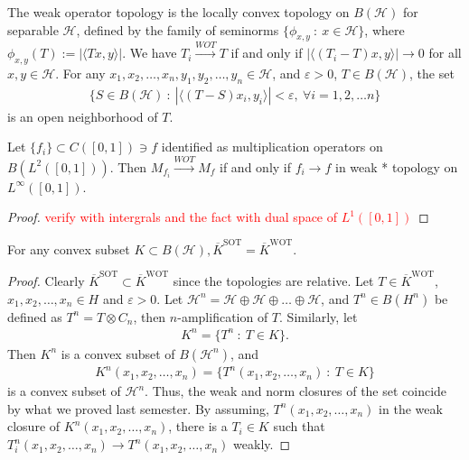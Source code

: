 \begin{definition}
  The weak operator topology is the locally convex topology on
  $B(\mathcal{H})$ for separable $\mathcal{H}$, defined by the family
  of seminorms $\{ \phi_{x, y}  \ : \  x \in \mathcal{H} \}$, where
  $\phi_{ x, y}(T) := |\langle  Tx , y \rangle |$.
  We have $T_i \stackrel{WOT}{\to} T$ if and only if $|\langle (T_i -
  T) x , y \rangle |
  \to 0$ for all $x,y \in \mathcal{H}$.
  For any $x_1 , x_2 , \ldots , x_n, y_1 , y_2 , \ldots , y_n \in
  \mathcal{H}$, and
  $\varepsilon > 0$, $T \in B(\mathcal{H})$, the set
  \begin{align*}
    \{  S \in B(\mathcal{H})  \ : \  |\langle (T - S) x_i , y_i
    \rangle | < \varepsilon, \ \forall i = 1,2, \ldots n \}
  \end{align*}
  is an open neighborhood of $T$.
\end{definition}

\begin{example}
  Let $\{ f_i \} \subset  C([0, 1]) \ni f$ identified as
  multiplication operators on $  B(L^{2}([0, 1]))$. Then $M_{f_i}
  \stackrel{WOT}{\to} M_{f}$ if and only if $f_i \to f$ in weak * topology
  on $L^{\infty}([0, 1])$.
\end{example}
\begin{proof}
  \textcolor{red}{verify with intergrals and the fact with dual space
  of $L^{1}([0, 1])$}
\end{proof}

\begin{lemma}
  For any convex subset $K \subset B(\mathcal{H}),
  \overline{K}^{\textrm{SOT}} = \overline{K}^{\textrm{WOT}}$.
\end{lemma}
\begin{proof}
  Clearly $\overline{K}^{\textrm{SOT}} \subset
  \overline{K}^{\textrm{WOT}}$ since the topologies are relative.
  Let $ T \in \overline{K}^{\textrm{WOT}}$, $ x_1 , x_2 , \ldots ,
  x_n \in H$ and $ \varepsilon > 0$. Let $\mathcal{H}^n =
  \mathcal{H} \oplus \mathcal{H} \oplus \ldots \oplus \mathcal{H}$,
  and $T^n \in B(H^n)$ be defined as $T^n = T \otimes C_n$, then
  $n$-amplification of $T$. Similarly, let
  \begin{align*}
    K^n = \{ T^n  \ : \  T \in K \}.
  \end{align*}
  Then $K^n$ is a convex subset of $B(\mathcal{H}^n)$, and
  \begin{align*}
    K^n(x_1 , x_2 , \ldots , x_n) = \{ T^n(x_1 , x_2 , \ldots , x_n)
    \ : \ T \in K  \}
  \end{align*}
  is a convex subset of $\mathcal{H}^n$. Thus, the weak and norm
  closures of the set coincide by what we proved last semester. By
  assuming, $T^n(x_1 , x_2 , \ldots , x_n)$ in the weak closure of
  $K^n(x_1 , x_2 , \ldots , x_n)$, there is a $T_i \in K$ such that
  $T_i^n(x_1 , x_2 , \ldots , x_n) \to T^n(x_1 , x_2 , \ldots , x_n)$ weakly.
\end{proof}

